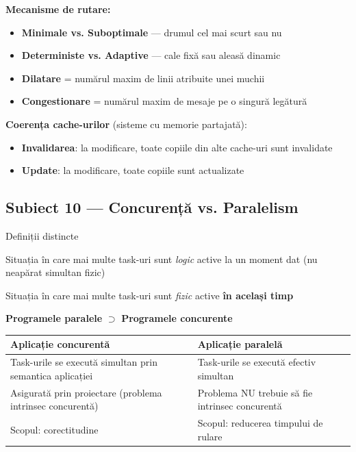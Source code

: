 \documentclass[a4paper,11pt]{article}
\newcommand{\thead}[1]{\cellcolor{tblh}\color{white}\textbf{#1}}
\newcommand{\subiect}[2]{\subsection{Subiect \textcolor{numcol}{#1} — #2}}
\begin{document}
\textbf{Mecanisme de rutare:}
\begin{itemize}[noitemsep]
  \item \textbf{Minimale vs. Suboptimale} — drumul cel mai scurt sau nu
  \item \textbf{Deterministe vs. Adaptive} — cale fixă sau aleasă dinamic
  \item \textbf{Dilatare} = numărul maxim de linii atribuite unei muchii
  \item \textbf{Congestionare} = numărul maxim de mesaje pe o singură legătură
\end{itemize}

\textbf{Coerența cache-urilor} (sisteme cu memorie partajată):
\begin{itemize}[noitemsep]
  \item \textbf{Invalidarea}: la modificare, toate copiile din alte cache-uri sunt invalidate
  \item \textbf{Update}: la modificare, toate copiile sunt actualizate
\end{itemize}

\subiect{10}{Concurență vs. Paralelism}

\begin{defbox}{Definiții distincte}
\begin{description}[leftmargin=3cm, noitemsep]
  \item[\textbf{Concurență}] Situația în care mai multe task-uri sunt \emph{logic} active la un moment dat (nu neapărat simultan fizic)
  \item[\textbf{Paralelism}] Situația în care mai multe task-uri sunt \emph{fizic} active \textbf{în același timp}
\end{description}
\textbf{Programele paralele} $\supset$ \textbf{Programele concurente}
\end{defbox}

\begin{center}
\begin{tabular}{ll}
\toprule
\thead{Aplicație concurentă} & \thead{Aplicație paralelă} \\
\midrule
Task-urile se execută simultan prin semantica aplicației & Task-urile se execută efectiv simultan \\
Asigurată prin proiectare (problema intrinsec concurentă) & Problema NU trebuie să fie intrinsec concurentă \\
Scopul: corectitudine & Scopul: reducerea timpului de rulare \\
\bottomrule
\end{tabular}
\end{center}
\end{document}
